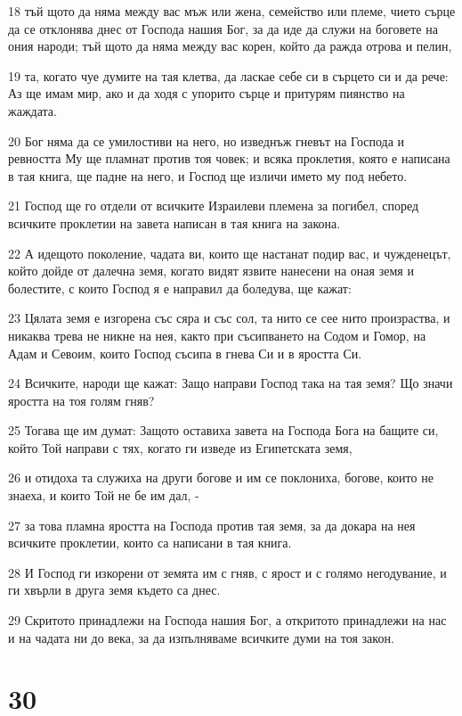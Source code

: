 \par 18 тъй щото да няма между вас мъж или жена, семейство или племе, чието сърце да се отклонява днес от Господа нашия Бог, за да иде да служи на боговете на ония народи; тъй щото да няма между вас корен, който да ражда отрова и пелин,
\par 19 та, когато чуе думите на тая клетва, да ласкае себе си в сърцето си и да рече: Аз ще имам мир, ако и да ходя с упорито сърце и притурям пиянство на жаждата.
\par 20 Бог няма да се умилостиви на него, но изведнъж гневът на Господа и ревността Му ще пламнат против тоя човек; и всяка проклетия, която е написана в тая книга, ще падне на него, и Господ ще изличи името му под небето.
\par 21 Господ ще го отдели от всичките Израилеви племена за погибел, според всичките проклетии на завета написан в тая книга на закона.
\par 22 А идещото поколение, чадата ви, които ще настанат подир вас, и чужденецът, който дойде от далечна земя, когато видят язвите нанесени на оная земя и болестите, с които Господ я е направил да боледува, ще кажат:
\par 23 Цялата земя е изгорена със сяра и със сол, та нито се сее нито произраства, и никаква трева не никне на нея, както при съсипването на Содом и Гомор, на Адам и Севоим, които Господ съсипа в гнева Си и в яростта Си.
\par 24 Всичките, народи ще кажат: Защо направи Господ така на тая земя? Що значи яростта на тоя голям гняв?
\par 25 Тогава ще им думат: Защото оставиха завета на Господа Бога на бащите си, който Той направи с тях, когато ги изведе из Египетската земя,
\par 26 и отидоха та служиха на други богове и им се поклониха, богове, които не знаеха, и които Той не бе им дал, -
\par 27 за това пламна яростта на Господа против тая земя, за да докара на нея всичките проклетии, които са написани в тая книга.
\par 28 И Господ ги изкорени от земята им с гняв, с ярост и с голямо негодувание, и ги хвърли в друга земя където са днес.
\par 29 Скритото принадлежи на Господа нашия Бог, а откритото принадлежи на нас и на чадата ни до века, за да изпълняваме всичките думи на тоя закон.

\chapter{30}

